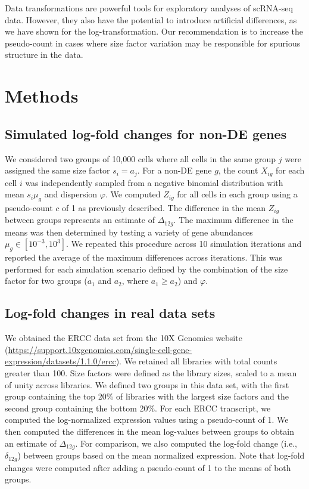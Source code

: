 \documentclass[10pt,letterpaper]{article}
\begin{document}
Data transformations are powerful tools for exploratory analyses of scRNA-seq data.
However, they also have the potential to introduce artificial differences, as we have shown for the log-transformation.
Our recommendation is to increase the pseudo-count in cases where size factor variation may be responsible for spurious structure in the data.

\section{Methods}

\subsection{Simulated log-fold changes for non-DE genes}
We considered two groups of 10,000 cells where all cells in the same group $j$ were assigned the same size factor $s_i=a_j$.
For a non-DE gene $g$, the count $X_{ig}$ for each cell $i$ was independently sampled from a negative binomial distribution with mean $s_i\mu_g$ and dispersion $\varphi$.
We computed $Z_{ig}$ for all cells in each group using a pseudo-count $c$ of 1 as previously described.
The difference in the mean $Z_{ig}$ between groups represents an estimate of $\Delta_{12g}$.
The maximum difference in the means was then determined by testing a variety of gene abundances $\mu_g \in [10^{-3}, 10^3]$.
We repeated this procedure across 10 simulation iterations and reported the average of the maximum differences across iterations.
This was performed for each simulation scenario defined by the combination of the size factor for two groups ($a_1$ and $a_2$, where $a_1 \ge a_2$) and $\varphi$.

\subsection{Log-fold changes in real data sets}
We obtained the ERCC data set from the 10X Genomics website (\url{https://support.10xgenomics.com/single-cell-gene-expression/datasets/1.1.0/ercc}).
We retained all libraries with total counts greater than 100.
Size factors were defined as the library sizes, scaled to a mean of unity across libraries.
We defined two groups in this data set, with the first group containing the top 20\% of libraries with the largest size factors and the second group containing the bottom 20\%.
For each ERCC transcript, we computed the log-normalized expression values using a pseudo-count of 1.
We then computed the differences in the mean log-values between groups to obtain an estimate of $\Delta_{12g}$.
For comparison, we also computed the log-fold change (i.e., $\delta_{12g}$) between groups based on the mean normalized expression.
Note that log-fold changes were computed after adding a pseudo-count of 1 to the means of both groups.
\end{document}
